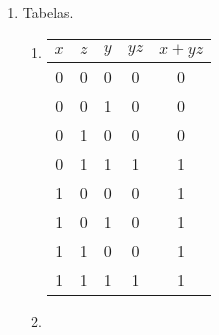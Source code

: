 \documentclass{article}
\begin{document}
\begin{enumerate}
	\item Tabelas.
	      \begin{enumerate}

		      \addtocounter{enumii}{1}
		      \item

		            \begin{center}
			            \begin{tabular}{|c c c || c c|}
				            \hline
				            \( x \) & \( z \) & \( y \) & \( yz \) & \( x + yz \) \\ [0.5ex]
				            \hline\hline
				            0       & 0       & 0       & 0        & 0            \\
				            \hline
				            0       & 0       & 1       & 0        & 0            \\
				            \hline
				            0       & 1       & 0       & 0        & 0            \\
				            \hline
				            0       & 1       & 1       & 1        & 1            \\
				            \hline
				            1       & 0       & 0       & 0        & 1            \\
				            \hline
				            1       & 0       & 1       & 0        & 1            \\
				            \hline
				            1       & 1       & 0       & 0        & 1            \\
				            \hline
				            1       & 1       & 1       & 1        & 1            \\ [1ex]
				            \hline
			            \end{tabular}
		            \end{center}

		      \item


\end{enumerate}
\end{enumerate}
\end{document}
